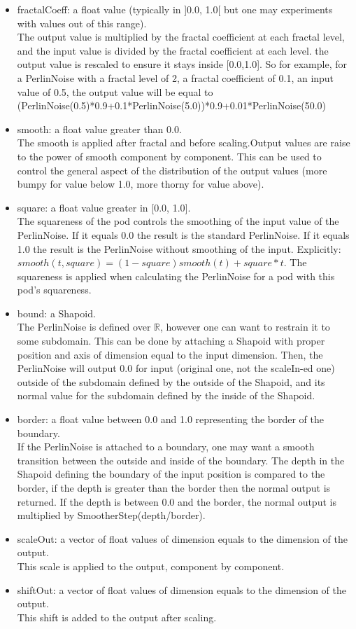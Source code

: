\begin{itemize}
\item fractalCoeff: a float value (typically in ]0.0, 1.0[ but one may experiments with values out of this range).\\
The output value is multiplied by the fractal coefficient at each fractal level, and the input value is divided by the fractal coefficient at each level. the output value is rescaled to ensure it stays inside [0.0,1.0]. So for example, for a PerlinNoise with a fractal level of 2, a fractal coefficient of 0.1, an input value of 0.5, the output value will be equal to (PerlinNoise(0.5)*0.9+0.1*PerlinNoise(5.0))*0.9+0.01*PerlinNoise(50.0)
\item smooth: a float value greater than 0.0.\\
The smooth is applied after fractal and before scaling.Output values are raise to the power of smooth component by component. This can be used to control the general aspect of the distribution of the output values (more bumpy for value below 1.0, more thorny for value above).
\item square: a float value greater in [0.0, 1.0].\\
The squareness of the pod controls the smoothing of the input value of the PerlinNoise. If it equals 0.0 the result is the standard PerlinNoise. If it equals 1.0 the result is the PerlinNoise without smoothing of the input. Explicitly: $smooth(t,square)=(1-square)smooth(t)+square*t$. The squareness is applied when calculating the PerlinNoise for a pod with this pod's squareness.\\
\item bound: a Shapoid.\\
The PerlinNoise is defined over $\mathbb{R}$, however one can want to restrain it to some subdomain. This can be done by attaching a Shapoid with proper position and axis of dimension equal to the input dimension. Then, the PerlinNoise will output 0.0 for input (original one, not the scaleIn-ed one) outside of the subdomain defined by the outside of the Shapoid, and its normal value for the subdomain defined by the inside of the Shapoid.
\item border: a float value between 0.0 and 1.0 representing the border of the boundary.\\
If the PerlinNoise is attached to a boundary, one may want a smooth transition between the outside and inside of the boundary. The depth in the Shapoid defining the boundary of the input position is compared to the border, if the depth is greater than the border then the normal output is returned. If the depth is between 0.0 and the border, the normal output is multiplied by SmootherStep(depth/border).
\item scaleOut: a vector of float values of dimension equals to the dimension of the output.\\
This scale is applied to the output, component by component.
\item shiftOut: a vector of float values of dimension equals to the dimension of the output.\\
This shift is added to the output after scaling.
\end{itemize}

